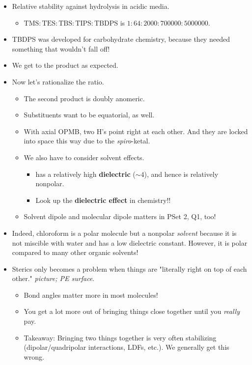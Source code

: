 \documentclass[../notes.tex]{subfiles}
\begin{document}
\begin{itemize}
    \item Relative stability against hydrolysis in acidic media.
    \begin{itemize}
        \item $\text{TMS}:\text{TES}:\text{TBS}:\text{TIPS}:\text{TBDPS}$ is $1:64:\num{2000}:\num{700000}:\num{5000000}$.
    \end{itemize}
    \item TBDPS was developed for carbohydrate chemistry, because they needed something that wouldn't fall off!
    \item We get to the product as expected.
    \item Now let's rationalize the ratio.
    \begin{itemize}
        \item The second product is doubly anomeric.
        \item Substituents want to be equatorial, as well.
        \item With axial OPMB, two H's point right at each other. And they are locked into space this way due to the \emph{spiro}-ketal.
        \item We also have to consider solvent effects.
        \begin{itemize}
            \item {} has a relatively high \textbf{dielectric} ($\sim 4$), and hence is relatively nonpolar.
            \item Look up the \textbf{dielectric effect} in chemistry!!
        \end{itemize}
        \item Solvent dipole and molecular dipole matters in PSet 2, Q1, too!
    \end{itemize}
    \item Indeed, chloroform is a polar molecule but a nonpolar \emph{solvent} because it is not miscible with water and has a low dielectric constant. However, it is polar compared to many other organic solvents!
    \item Sterics only becomes a problem when things are "literally right on top of each other."
    \emph{picture;  PE surface}.
    \begin{itemize}
        \item Bond angles matter more in most molecules!
        \item You get a lot more out of bringing things close together until you \emph{really} pay.
        \item Takeaway: Bringing two things together is very often stabilizing (dipolar/quadripolar interactions, LDFs, etc.). We generally get this wrong.

\end{itemize}
\end{itemize}
\end{document}
